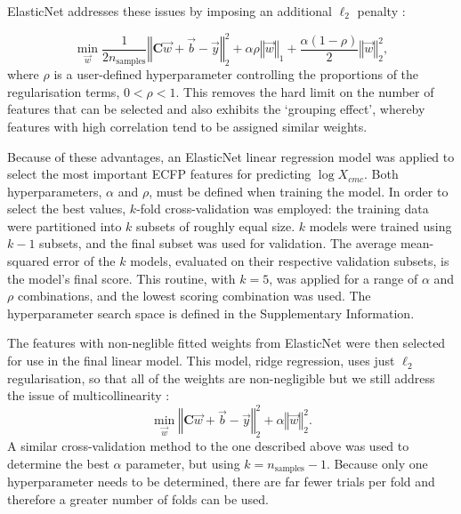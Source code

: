 ElasticNet addresses these issues by imposing an additional $\ell_2$ penalty
\cite{zouRegularizationVariableSelection2005}:

\begin{equation}
    \label{eq:elastic}
    \min_{\vec{w}} { \frac{1}{2n_{\text{samples}}} \left \Vert \mathbf{C}\vec{w} + \vec{b}- \vec{y} \right \Vert_2 ^ 2 + \alpha\rho \left \Vert \vec{w} \right \Vert_1} + \frac{\alpha(1 - \rho)}{2} \left \Vert \vec{w} \right \Vert_2^2,
\end{equation}
where $\rho$ is a user-defined hyperparameter controlling the proportions of the
regularisation terms, $0 < \rho < 1$. This removes the hard limit on the number
of features that can be selected and also exhibits the `grouping effect',
whereby features with high correlation tend to be assigned similar weights.

Because of these advantages, an ElasticNet linear regression model was applied
to select the most important ECFP features for predicting $\log X_{cmc}$. Both
hyperparameters, $\alpha$ and $\rho$, must be defined when training the model.
In order to select the best values, $k$-fold cross-validation was employed: the
training data were partitioned into $k$ subsets of roughly equal size. $k$
models were trained using $k-1$ subsets, and the final subset was used for
validation. The average mean-squared error of the $k$ models, evaluated on their
respective validation subsets, is the model's final score. This routine, with
$k=5$, was applied for a range of $\alpha$ and $\rho$ combinations, and the
lowest scoring combination was used. The hyperparameter search space is defined
in the Supplementary Information.

The features with non-neglible fitted weights from ElasticNet were then selected
for use in the final linear model. This model, ridge regression, uses just
$\ell_2$ regularisation, so that all of the weights are non-negligible but we
still address the issue of multicollinearity \cite{mcdonaldRidgeRegression2009}:
\begin{equation}
    \min_{\vec{w}} \left \Vert \mathbf{C} \vec{w} + \vec{b} - \vec{y} \right \Vert_2^2 + \alpha \left \Vert \vec{w}\right \Vert_2^2.
\end{equation}
A similar cross-validation method to the one described above was used to
determine the best $\alpha$ parameter, but using $k=n_\text{samples}-1$. Because
only one hyperparameter needs to be determined, there are far fewer trials per
fold and therefore a greater number of folds can be used.

